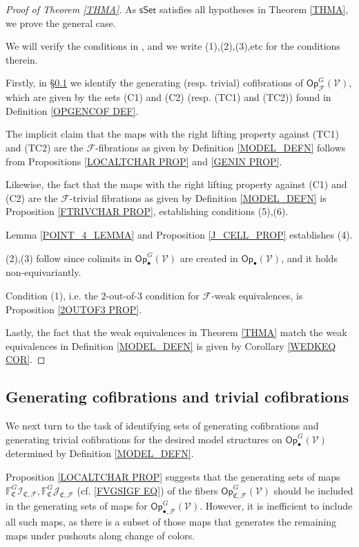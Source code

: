 \documentclass[a4paper,10pt
 ,final
]{article}%
\numberwithin{equation}{section}
\numberwithin{figure}{section}
\theoremstyle{definition} %
\newcommand{\sSet}{\ensuremath{\mathsf{sSet}}}%
\newcommand{\Op}{\mathsf{Op}}%
\newcommand{\F}{\ensuremath{\mathcal F}}
\newcommand{\V}{\ensuremath{\mathcal V}}
\newcommand{\1}{\ensuremath{\mathbbm 1}}%
\begin{document}
\begin{proof}[Proof of Theorem \ref{THMA}]
      As $\sSet$ satisfies all 
      hypotheses in Theorem \ref{THMA}, we prove the general case.

      We will verify the conditions in 
\cite[Theorem 2.1.19]{Hov99}, and we write (1),(2),(3),etc for the conditions therein.

Firstly, in \S \ref{GENCOF SEC} we identify
the generating (resp. trivial) cofibrations of $\mathsf{Op}^G_{\F}(\V)$,
which are given by the sets 
(C1) and (C2) (resp. (TC1) and (TC2))
found in Definition \ref{OPGENCOF DEF}.

The implicit claim that the maps
with the right lifting property against 
(TC1) and (TC2)
are the $\F$-fibrations as given by 
Definition \ref{MODEL_DEFN}
follows from Propositions \ref{LOCALTCHAR PROP} and \ref{GENIN PROP}.

Likewise, the fact that the maps
with the right lifting property against 
(C1) and (C2) are the 
$\F$-trivial fibrations as given by 
Definition \ref{MODEL_DEFN}
is Proposition \ref{FTRIVCHAR PROP}, 
establishing conditions (5),(6).

Lemma \ref{POINT_4_LEMMA} and Proposition \ref{J_CELL_PROP} establishes (4).

(2),(3) follow since colimits in $\mathsf{Op}^G_\bullet(\V)$ are created in $\Op_{\bullet}(\V)$, and it holds non-equivariantly.

Condition (1), i.e. the $2$-out-of-$3$ condition for $\F$-weak equivalences, 
is Proposition \ref{2OUTOF3 PROP}.

Lastly, the fact that the weak equivalences in 
Theorem \ref{THMA}
match the weak equivalences in
Definition \ref{MODEL_DEFN} is given by 
Corollary \ref{WEDKEQ COR}.
\end{proof}





\subsection{Generating cofibrations and trivial cofibrations}
\label{GENCOF SEC}

We next turn to the task of identifying sets of generating cofibrations and generating trivial cofibrations
for the desired model structures
on $\mathsf{Op}^G_{\bullet}(\V)$ determined by Definition \ref{MODEL_DEFN}.


Proposition \ref{LOCALTCHAR PROP} suggests that
the generating sets of maps
$\mathbb{F}^G_{\mathfrak{C}} \mathcal{I}_{\mathfrak{C},\mathcal{F}},
\mathbb{F}^G_{\mathfrak{C}} \mathcal{J}_{\mathfrak{C},\mathcal{F}}$
(cf. \eqref{FVGSIGF EQ}) of the fibers 
$\mathsf{Op}^G_{\mathfrak{C},\F}(\V)$
should be included
in the generating sets of maps for 
$\mathsf{Op}^G_{\bullet,\F}(\V)$.
However, it is inefficient to include all such maps, 
as there is a subset of those maps
that generates the remaining maps under pushouts along change of colors.
\end{document}
